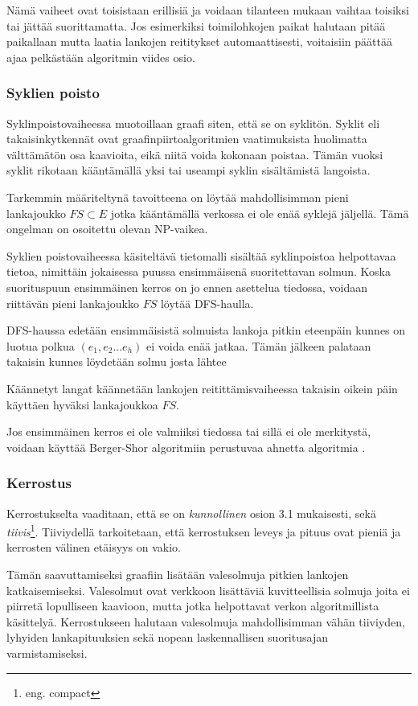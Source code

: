 \documentclass[finnish,12pt]{article}
\begin{document}
Nämä vaiheet ovat toisistaan erillisiä ja voidaan tilanteen mukaan vaihtaa toisiksi tai jättää suorittamatta.
Jos esimerkiksi toimilohkojen paikat halutaan pitää paikallaan mutta laatia lankojen reititykset automaattisesti, voitaisiin päättää ajaa pelkästään algoritmin viides osio.

		
		\subsubsection{Syklien poisto}

Syklinpoistovaiheessa muotoillaan graafi siten, että se on syklitön.
Syklit eli takaisinkytkennät ovat graafinpiirtoalgoritmien vaatimuksista huolimatta välttämätön osa kaavioita, eikä niitä voida kokonaan poistaa.
Tämän vuoksi syklit rikotaan kääntämällä yksi tai useampi syklin sisältämistä langoista.

Tarkemmin määriteltynä tavoitteena on löytää mahdollisimman pieni lankajoukko $FS \subset E $ jotka kääntämällä verkossa ei ole enää syklejä jäljellä.
Tämä ongelman on osoitettu olevan NP-vaikea. \cite{RefWorks:65}

Syklien poistovaiheessa käsiteltävä tietomalli sisältää syklinpoistoa helpottavaa tietoa, nimittäin jokaisessa puussa ensimmäisenä suoritettavan solmun.
Koska suorituspuun ensimmäinen kerros on jo ennen asettelua tiedossa, voidaan riittävän pieni lankajoukko $FS$ löytää DFS-haulla.

DFS-haussa edetään ensimmäisistä solmuista lankoja pitkin eteenpäin kunnes on luotua polkua $(e_1,e_2...e_h)$ ei voida enää jatkaa.
Tämän jälkeen palataan takaisin kunnes löydetään solmu josta lähtee 
\cite{RefWorks:69}

Käännetyt langat käännetään lankojen reitittämisvaiheessa takaisin oikein päin käyttäen hyväksi lankajoukkoa $FS$.

Jos ensimmäinen kerros ei ole valmiiksi tiedossa tai sillä ei ole merkitystä, voidaan käyttää Berger-Shor algoritmiin \cite{RefWorks:68} perustuvaa ahnetta algoritmia \cite{RefWorks:48}.

		\subsubsection{Kerrostus}
Kerrostukselta vaaditaan, että se on \emph{kunnollinen} osion 3.1 mukaisesti, sekä \emph{tiivis}\footnote{eng. compact}.
Tiiviydellä tarkoitetaan, että kerrostuksen leveys ja pituus ovat pieniä ja kerrosten välinen etäisyys on vakio. 

Tämän saavuttamiseksi graafiin lisätään valesolmuja pitkien lankojen katkaisemiseksi.
Valesolmut ovat verkkoon lisättäviä kuvitteellisia solmuja joita ei piirretä lopulliseen kaavioon, mutta jotka helpottavat verkon algoritmillista käsittelyä.
Kerrostukseen halutaan valesolmuja mahdollisimman vähän tiiviyden, lyhyiden lankapituuksien sekä nopean laskennallisen suoritusajan varmistamiseksi.
\end{document}
